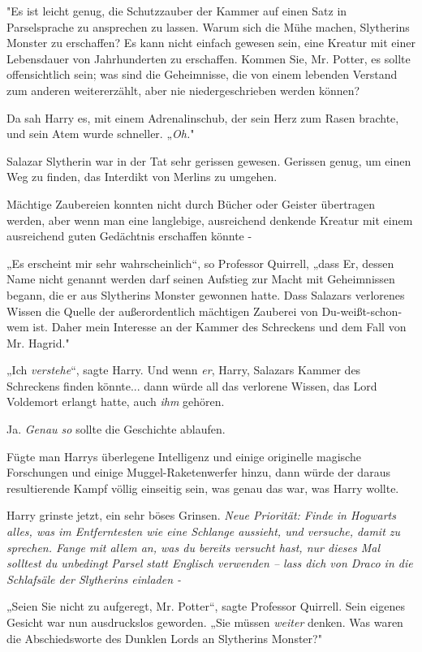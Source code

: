 {"Es ist leicht genug, die Schutzzauber der Kammer auf einen Satz in Parselsprache zu ansprechen zu lassen. Warum sich die Mühe machen, Slytherins Monster zu erschaffen? Es kann nicht einfach gewesen sein, eine Kreatur mit einer Lebensdauer von Jahrhunderten zu erschaffen. Kommen Sie, Mr. Potter, es sollte offensichtlich sein; was sind die Geheimnisse, die von einem lebenden Verstand zum anderen weitererzählt, aber nie niedergeschrieben werden können?

Da sah Harry es, mit einem Adrenalinschub, der sein Herz zum Rasen brachte, und sein Atem wurde schneller. „\emph{Oh.}"

Salazar Slytherin war in der Tat sehr gerissen gewesen. Gerissen genug, um einen Weg zu finden, das Interdikt von Merlins zu umgehen.

Mächtige Zaubereien konnten nicht durch Bücher oder Geister übertragen werden, aber wenn man eine langlebige, ausreichend denkende Kreatur mit einem ausreichend guten Gedächtnis erschaffen könnte -

„Es erscheint mir sehr wahrscheinlich“, so Professor Quirrell, „dass Er, dessen Name nicht genannt werden darf seinen Aufstieg zur Macht mit Geheimnissen begann, die er aus Slytherins Monster gewonnen hatte. Dass Salazars verlorenes Wissen die Quelle der außerordentlich mächtigen Zauberei von Du-weißt-schon-wem ist. Daher mein Interesse an der Kammer des Schreckens und dem Fall von Mr. Hagrid."

„Ich \emph{verstehe}“, sagte Harry. Und wenn \emph{er}, Harry, Salazars Kammer des Schreckens finden könnte... dann würde all das verlorene Wissen, das Lord Voldemort erlangt hatte, auch \emph{ihm} gehören.

Ja. \emph{Genau so} sollte die Geschichte ablaufen.

Fügte man Harrys überlegene Intelligenz und einige originelle magische Forschungen und einige Muggel-Raketenwerfer hinzu, dann würde der daraus resultierende Kampf völlig einseitig sein, was genau das war, was Harry wollte.

Harry grinste jetzt, ein sehr böses Grinsen. \emph{Neue Priorität: Finde in Hogwarts alles, was im Entferntesten wie eine Schlange aussieht, und versuche, damit zu sprechen. Fange mit allem an, was du bereits versucht hast, nur dieses Mal solltest du unbedingt} \emph{Parsel} \emph{statt Englisch verwenden -- lass dich von Draco in die Schlafsäle der Slytherins einladen -}

„Seien Sie nicht zu aufgeregt, Mr. Potter“, sagte Professor Quirrell. Sein eigenes Gesicht war nun ausdruckslos geworden. „Sie müssen \emph{weiter} denken. Was waren die Abschiedsworte des Dunklen Lords an Slytherins Monster?"

}
